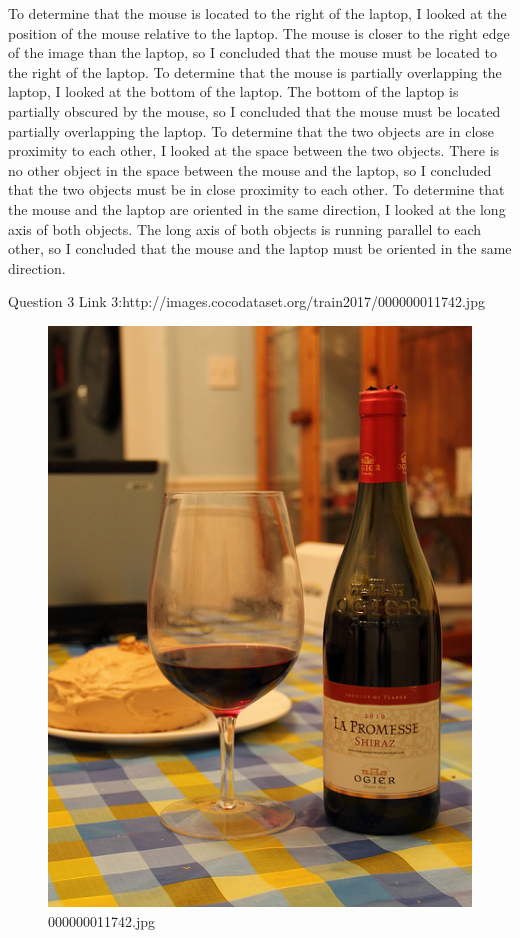 \begin{enumerate}
{        To determine that the mouse is located to the right of the laptop, I looked at the position of the mouse relative to the laptop. The mouse is closer to the right edge of the image than the laptop, so I concluded that the mouse must be located to the right of the laptop.
        To determine that the mouse is partially overlapping the laptop, I looked at the bottom of the laptop. The bottom of the laptop is partially obscured by the mouse, so I concluded that the mouse must be located partially overlapping the laptop.
        To determine that the two objects are in close proximity to each other, I looked at the space between the two objects. There is no other object in the space between the mouse and the laptop, so I concluded that the two objects must be in close proximity to each other.
        To determine that the mouse and the laptop are oriented in the same direction, I looked at the long axis of both objects. The long axis of both objects is running parallel to each other, so I concluded that the mouse and the laptop must be oriented in the same direction.}
    \end{enumerate}
Question 3
Link 3:http://images.cocodataset.org/train2017/000000011742.jpg
    \begin{figure}[h]
        \centering
        \includegraphics[width=0.8\linewidth]{../image set/easy/000000011742.jpg}
        \caption{000000011742.jpg}
    \end{figure}
